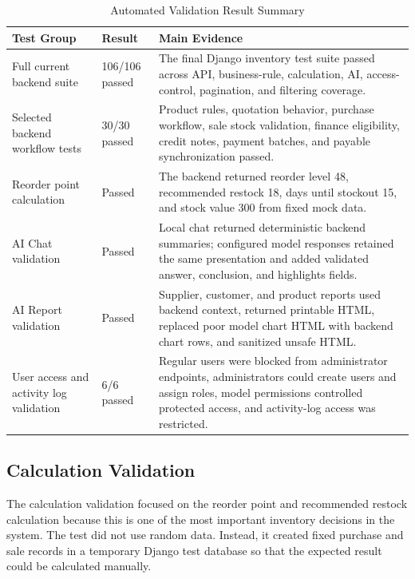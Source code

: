 \begin{table}[H]
	\centering
	\BlackbookTableSetup
	\caption{Automated Validation Result Summary}
	\label{tab:automated-validation-result-summary}
	\begin{tabularx}{\textwidth}{|B{3.5cm}|D{2cm}|Z|}
		\hline
		\textbf{Test Group} & \textbf{Result} & \textbf{Main Evidence} \\ \hline
		Full current backend suite & 106/106 passed & The final Django inventory test suite passed across API, business-rule, calculation, AI, access-control, pagination, and filtering coverage. \\ \hline
		Selected backend workflow tests & 30/30 passed & Product rules, quotation behavior, purchase workflow, sale stock validation, finance eligibility, credit notes, payment batches, and payable synchronization passed. \\ \hline
		Reorder point calculation & Passed & The backend returned reorder level 48, recommended restock 18, days until stockout 15, and stock value 300 from fixed mock data. \\ \hline
		AI Chat validation & Passed & Local chat returned deterministic backend summaries; configured model responses retained the same presentation and added validated answer, conclusion, and highlights fields. \\ \hline
		AI Report validation & Passed & Supplier, customer, and product reports used backend context, returned printable HTML, replaced poor model chart HTML with backend chart rows, and sanitized unsafe HTML. \\ \hline
		User access and activity log validation & 6/6 passed & Regular users were blocked from administrator endpoints, administrators could create users and assign roles, model permissions controlled protected access, and activity-log access was restricted. \\ \hline
	\end{tabularx}
\end{table}

\subsection{Calculation Validation}
The calculation validation focused on the reorder point and recommended restock calculation because this is one of the most important inventory decisions in the system. The test did not use random data. Instead, it created fixed purchase and sale records in a temporary Django test database so that the expected result could be calculated manually.

